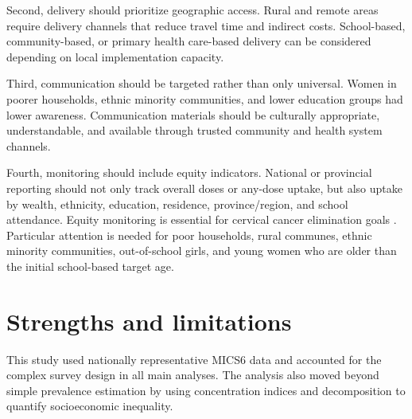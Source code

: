 Second, delivery should prioritize geographic access. Rural and remote areas require delivery channels that reduce travel time and indirect costs. School-based, community-based, or primary health care-based delivery can be considered depending on local implementation capacity.

Third, communication should be targeted rather than only universal. Women in poorer households, ethnic minority communities, and lower education groups had lower awareness. Communication materials should be culturally appropriate, understandable, and available through trusted community and health system channels.

Fourth, monitoring should include equity indicators. National or provincial reporting should not only track overall doses or any-dose uptake, but also uptake by wealth, ethnicity, education, residence, province/region, and school attendance. Equity monitoring is essential for cervical cancer elimination goals \cite{who2020strategy}. Particular attention is needed for poor households, rural communes, ethnic minority communities, out-of-school girls, and young women who are older than the initial school-based target age.

\section{Strengths and limitations}

This study used nationally representative MICS6 data and accounted for the complex survey design in all main analyses. The analysis also moved beyond simple prevalence estimation by using concentration indices and decomposition to quantify socioeconomic inequality.

